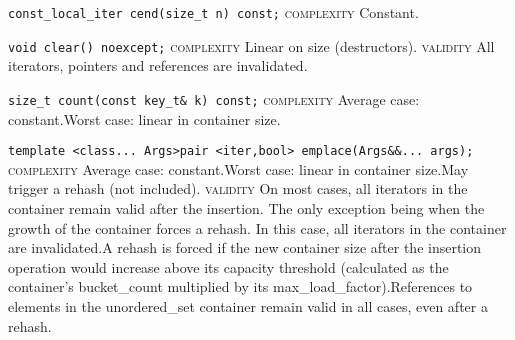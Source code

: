 \noindent{}\hspace*{0.25em}\lstinline[basicstyle=\ttfamily\color{cgreen}]{const_local_iter cend(size_t n) const;} \textsc{complexity} Constant.\\\vspace{-0.6em}

\noindent{}\hspace*{0.25em}\lstinline[basicstyle=\ttfamily\color{corange}]{void clear() noexcept;} \textsc{complexity} Linear on size (destructors). \textsc{validity} All iterators, pointers and references are invalidated.\\\vspace{-0.6em}

\noindent{}\hspace*{0.25em}\lstinline[basicstyle=\ttfamily\color{corange}]{size_t count(const key_t& k) const;} \textsc{complexity} Average case: constant.Worst case: linear in container size.\\\vspace{-0.6em}

\noindent{}\hspace*{0.25em}\lstinline[basicstyle=\ttfamily\color{corange}]{template <class... Args>pair <iter,bool> emplace(Args&&... args);} \textsc{complexity} Average case: constant.Worst case: linear in container size.May trigger a rehash (not included). \textsc{validity} On most cases, all iterators in the container remain valid after the insertion. The only exception being when the growth of the container forces a rehash. In this case, all iterators in the container are invalidated.A rehash is forced if the new container size after the insertion operation would increase above its capacity threshold (calculated as the container's bucket\_count multiplied by its max\_load\_factor).References to elements in the unordered\_set container remain valid in all cases, even after a rehash.\\\vspace{-0.6em}

